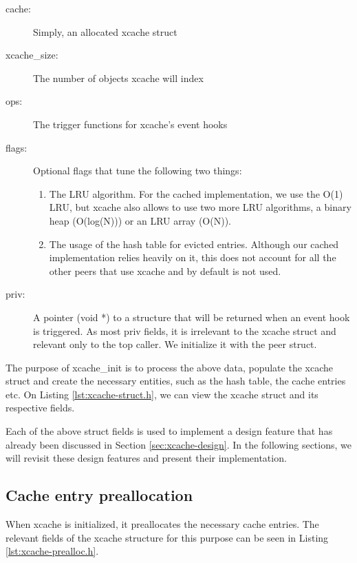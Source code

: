 \begin{description}
	\item[cache:] Simply, an allocated xcache struct
	\item[xcache\_size:] The number of objects xcache will index
	\item[ops:] The trigger functions for xcache's event hooks
	\item[flags:] Optional flags that tune the following two things:
		\begin{enumerate}
			\item The LRU algorithm. For the cached implementation, 
				we use the O(1) LRU, but xcache also allows to 
				use two more LRU algorithms, a binary heap 
				(O(log(N))) or an LRU array (O(N)).
			\item The usage of the hash table for evicted entries.  
				Although our cached implementation relies 
				heavily on it, this does not account for all 
				the other peers that use xcache and by default 
				is not used.
		\end{enumerate}
	\item[priv:] A pointer (void *) to a structure that will be returned 
		when an event hook is triggered. As most priv fields, it is 
		irrelevant to the xcache struct and relevant only to the top 
		caller. We initialize it with the peer struct.
\end{description}

The purpose of xcache\_init is to process the above data, populate the xcache 
struct and create the necessary entities, such as the hash table, the cache 
entries etc. On Listing \ref{lst:xcache-struct.h}, we can view the xcache 
struct and its respective fields.


Each of the above \xcache struct fields is used to implement a design feature 
that has already been discussed in Section \ref{sec:xcache-design}. In the 
following sections, we will revisit these design features and present their 
implementation.

\subsection{Cache entry preallocation}

When xcache is initialized, it preallocates the necessary cache entries. The 
relevant fields of the xcache structure for this purpose can be seen in Listing 
\ref{lst:xcache-prealloc.h}.

